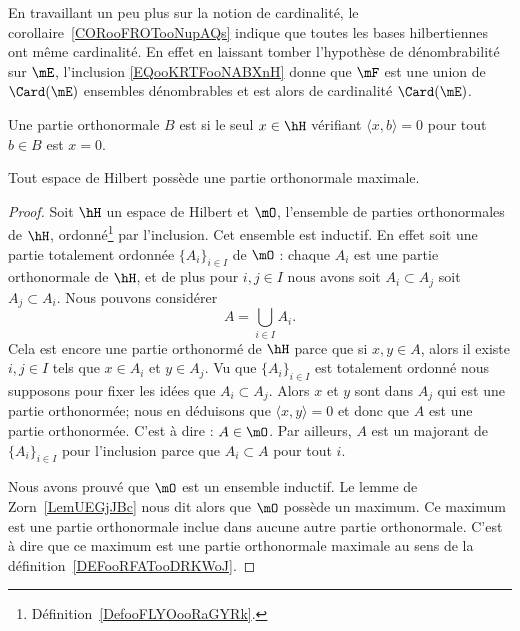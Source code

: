 \begin{remark}
    En travaillant un peu plus sur la notion de cardinalité, le corollaire~\ref{CORooFROTooNupAQs} indique que toutes les bases hilbertiennes ont même cardinalité. En effet en laissant tomber l'hypothèse de dénombrabilité sur \( \mE\), l'inclusion \eqref{EQooKRTFooNABXnH} donne que \( \mF\) est une union de \( \Card(\mE)\) ensembles dénombrables et est alors de cardinalité \( \Card(\mE)\).
\end{remark}

\begin{definition}      \label{DEFooRFATooDRKWoJ}
    Une partie orthonormale \( B\) est  si le seul \( x\in \hH\) vérifiant \( \langle x, b\rangle =0\) pour tout \( b\in B\) est \( x=0\).
\end{definition}

\begin{lemma}\label{LEMooXIECooCAQeJN}
    Tout espace de Hilbert possède une partie orthonormale maximale.
\end{lemma}

\begin{proof}
    Soit \( \hH\) un espace de Hilbert et \( \mO\), l'ensemble de parties orthonormales de \( \hH\), ordonné\footnote{Définition~\ref{DefooFLYOooRaGYRk}.} par l'inclusion. Cet ensemble est inductif. En effet soit une partie totalement ordonnée \( \{ A_i \}_{i\in I}\) de \( \mO\) : chaque \( A_i\) est une partie orthonormale de \( \hH\), et de plus pour \( i,j\in I\) nous avons soit \( A_i\subset A_j\) soit \( A_j\subset A_i\). Nous pouvons considérer
    \begin{equation}
        A=\bigcup_{i\in I}A_i.
    \end{equation}
    Cela est encore une partie orthonormé de \( \hH\) parce que si \( x,y\in A\), alors il existe \( i,j\in I\) tels que \( x\in A_i\) et \( y\in A_j\). Vu que \( \{ A_i \}_{i\in I}\) est totalement ordonné nous supposons pour fixer les idées que \( A_i\subset A_j\). Alors \(x \) et \( y\) sont dans \( A_j\) qui est une partie orthonormée; nous en déduisons que \( \langle x, y\rangle =0\) et donc que \( A\) est une partie orthonormée. C'est à dire : \( A\in \mO\). Par ailleurs, \( A\) est un majorant de \( \{ A_i \}_{i\in I}\) pour l'inclusion parce que \( A_i\subset A\) pour tout \( i\).

    Nous avons prouvé que \( \mO\) est un ensemble inductif. Le lemme de Zorn~\ref{LemUEGjJBc} nous dit alors que \( \mO\) possède un maximum. Ce maximum est une partie orthonormale inclue dans aucune autre partie orthonormale. C'est à dire que ce maximum est une partie orthonormale maximale au sens de la définition~\ref{DEFooRFATooDRKWoJ}.
\end{proof}

